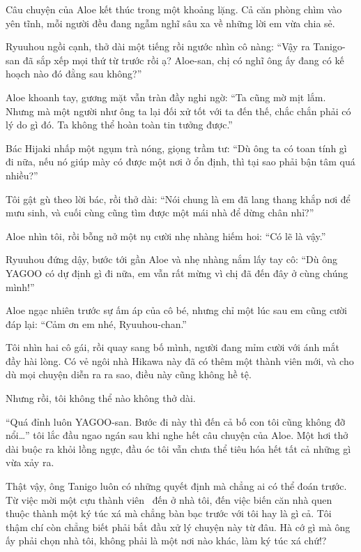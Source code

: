 \documentclass[../main.tex]{subfiles}
\begin{document}

Câu chuyện của Aloe kết thúc trong một khoảng lặng. Cả căn phòng chìm vào yên tĩnh, mỗi người đều đang ngẫm nghĩ sâu xa về những lời em vừa chia sẻ.

Ryuuhou ngồi cạnh, thở dài một tiếng rồi ngước nhìn cô nàng: ``Vậy ra Tanigo-san đã sắp xếp mọi thứ từ trước rồi ạ? Aloe-san, chị có nghĩ ông ấy đang có kế hoạch nào đó đằng sau không?''

Aloe khoanh tay, gương mặt vẫn tràn đầy nghi ngờ: ``Ta cũng mờ mịt lắm. Nhưng mà một người như ông ta lại đối xử tốt với ta đến thế, chắc chắn phải có lý do gì đó. Ta không thể hoàn toàn tin tưởng được.''

Bác Hijaki nhấp một ngụm trà nóng, giọng trầm tư: ``Dù ông ta có toan tính gì đi nữa, nếu nó giúp mày có được một nơi ở ổn định, thì tại sao phải bận tâm quá nhiều?''

Tôi gật gù theo lời bác, rồi thở dài: ``Nói chung là em đã lang thang khắp nơi để mưu sinh, và cuối cùng cũng tìm được một mái nhà để dừng chân nhỉ?''

Aloe nhìn tôi, rồi bỗng nở một nụ cười nhẹ nhàng hiếm hoi: ``Có lẽ là vậy.''

Ryuuhou đứng dậy, bước tới gần Aloe và nhẹ nhàng nắm lấy tay cô: ``Dù ông YAGOO có dự định gì đi nữa, em vẫn rất mừng vì chị đã đến đây ở cùng chúng mình!''

Aloe ngạc nhiên trước sự ấm áp của cô bé, nhưng chỉ một lúc sau em cũng cười đáp lại: ``Cảm ơn em nhé, Ryuuhou-chan.''

Tôi nhìn hai cô gái, rồi quay sang bố mình, người đang mỉm cười với ánh mắt đầy hài lòng. Có vẻ ngôi nhà Hikawa này đã có thêm một thành viên mới, và cho dù mọi chuyện diễn ra ra sao, điều này cũng không hề tệ.

Nhưng rồi, tôi không thể nào không thở dài.

``Quá đỉnh luôn YAGOO-san. Bước đi này thì đến cả bố con tôi cũng không đỡ nổi\dots'' tôi lắc đầu ngao ngán sau khi nghe hết câu chuyện của Aloe. Một hơi thở dài buộc ra khỏi lồng ngực, đầu óc tôi vẫn chưa thể tiêu hóa hết tất cả những gì vừa xảy ra.

Thật vậy, ông Tanigo luôn có những quyết định mà chẳng ai có thể đoán trước. Từ việc mời một cựu thành viên \hll\ đến ở nhà tôi, đến việc biến căn nhà quen thuộc thành một ký túc xá mà chẳng bàn bạc trước với tôi hay là gì cả. Tôi thậm chí còn chẳng biết phải bắt đầu xử lý chuyện này từ đâu. Hà cớ gì mà ông ấy phải chọn nhà tôi, không phải là một nơi nào khác, làm ký túc xá chứ!?
\end{document}
